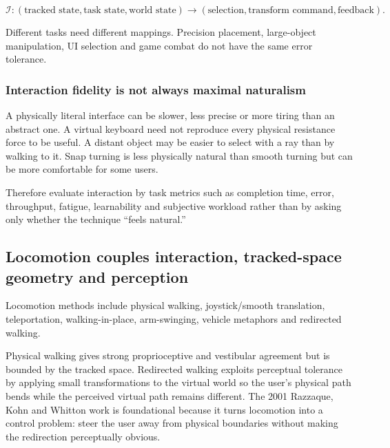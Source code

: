 \[
\mathcal I:
(\text{tracked state},\text{task state},\text{world state})
\rightarrow
(\text{selection},\text{transform command},\text{feedback}).
\]

Different tasks need different mappings. Precision placement, large-object manipulation, UI selection and game combat do not have the same error tolerance.

\subsubsection{Interaction fidelity is not always maximal naturalism}\label{04-visual-computing-ii-ch035-interaction-fidelity-is-not-always-maximal-naturalism}

\hypertarget{04-visual-computing-ii-ch035-interaction-fidelity-is-not-always-maximal-naturalism}{}

A physically literal interface can be slower, less precise or more tiring than an abstract one. A virtual keyboard need not reproduce every physical resistance force to be useful. A distant object may be easier to select with a ray than by walking to it. Snap turning is less physically natural than smooth turning but can be more comfortable for some users.

Therefore evaluate interaction by task metrics such as completion time, error, throughput, fatigue, learnability and subjective workload rather than by asking only whether the technique ``feels natural.''

\subsection{Locomotion couples interaction, tracked-space geometry and perception}\label{04-visual-computing-ii-ch035-locomotion-couples-interaction-tracked-space-geometry-and-perception}

\hypertarget{04-visual-computing-ii-ch035-locomotion-couples-interaction-tracked-space-geometry-and-perception}{}

Locomotion methods include physical walking, joystick/smooth translation, teleportation, walking-in-place, arm-swinging, vehicle metaphors and redirected walking.

Physical walking gives strong proprioceptive and vestibular agreement but is bounded by the tracked space. Redirected walking exploits perceptual tolerance by applying small transformations to the virtual world so the user's physical path bends while the perceived virtual path remains different. The 2001 Razzaque, Kohn and Whitton work is foundational because it turns locomotion into a control problem: steer the user away from physical boundaries without making the redirection perceptually obvious.

